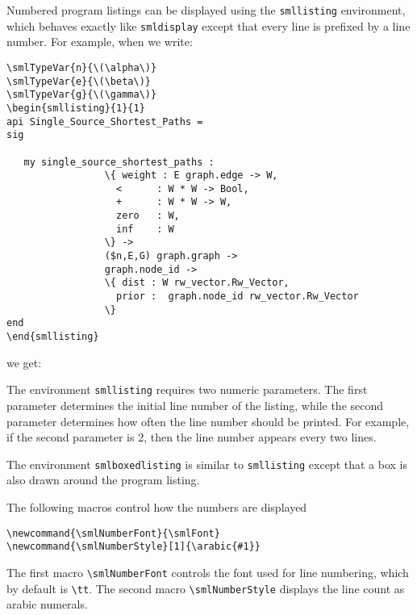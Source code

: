\documentclass{article}
\begin{document}
Numbered program listings can be displayed using the
\verb|smllisting| environment, which behaves exactly like
\verb|smldisplay| except that every line is prefixed by a
line number.  For example, when we write:
\begin{verbatim}
\smlTypeVar{n}{\(\alpha\)}
\smlTypeVar{e}{\(\beta\)}
\smlTypeVar{g}{\(\gamma\)}
\begin{smllisting}{1}{1}
api Single_Source_Shortest_Paths =
sig

   my single_source_shortest_paths :
                 \{ weight : E graph.edge -> W,
                   <      : W * W -> Bool,
                   +      : W * W -> W,
                   zero   : W,
                   inf    : W
                 \} ->
                 ($n,E,G) graph.graph ->
                 graph.node_id ->
                 \{ dist : W rw_vector.Rw_Vector,
                   prior :  graph.node_id rw_vector.Rw_Vector
                 \}
end
\end{smllisting}
\end{verbatim}
\noindent we get:

The environment \verb|smllisting| requires two numeric parameters.
The first parameter determines the initial line number of the
listing, while the second parameter determines how often the line
number should be printed.  For example, if the second parameter
is 2, then the line number appears every two lines. 

The environment \verb|smlboxedlisting| is similar to 
\verb|smllisting| except that a box is also drawn around the program
listing.

The following macros control how the numbers are displayed
\begin{verbatim}
\newcommand{\smlNumberFont}{\smlFont}
\newcommand{\smlNumberStyle}[1]{\arabic{#1}}
\end{verbatim}
The first macro \verb|\smlNumberFont| controls the font used
for line numbering, which by default is \verb|\tt|.  
The second macro \verb|\smlNumberStyle| displays the line count as
arabic numerals.  
\end{document}
